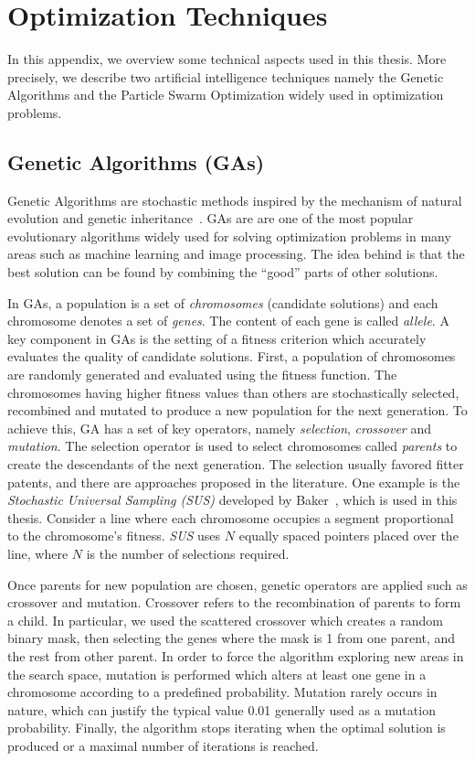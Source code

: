\chapter{Optimization Techniques} \label{app:optimization}
In this appendix, we overview some technical aspects used in this thesis. More precisely, we describe two artificial intelligence techniques namely the Genetic Algorithms and the Particle Swarm Optimization widely used in optimization problems.

\section{Genetic Algorithms (GAs)}
Genetic Algorithms are stochastic methods inspired by the mechanism of natural evolution and genetic inheritance~\cite{Yeh:LRIR07}. GAs are are one of the most popular evolutionary algorithms widely used for solving optimization problems in many areas such as machine learning and image processing.  The idea behind is that the best solution can be found by combining the ``good'' parts of other solutions.

In GAs, a population is a set of \emph{chromosomes} (candidate solutions) and each chromosome denotes a set of \emph{genes}. The content of each gene is called \emph{allele}. A key component in GAs is the setting of a fitness criterion which accurately evaluates the quality of candidate solutions. First, a population of chromosomes are randomly generated and evaluated using the fitness function. The chromosomes having higher fitness values than others are stochastically selected, recombined and mutated to produce a new population for the next generation. To achieve this, GA has a set of key operators, namely \emph{selection}, \emph{crossover} and \emph{mutation}. The selection operator is used to select chromosomes called \emph{parents} to create the descendants of the next generation. The selection usually favored fitter patents, and there are approaches proposed in the literature. One example is the \emph{Stochastic Universal Sampling (SUS)} developed by Baker~\cite{Baker:1987}, which is used in this thesis. Consider a line where each chromosome occupies a segment proportional to the chromosome's fitness. \emph{SUS} uses $N$ equally spaced pointers placed over the line, where $N$ is the number of selections required.

Once parents for new population are chosen, genetic operators are applied such as crossover and mutation. Crossover refers to the recombination of parents to form a child. In particular, we used the scattered crossover which creates a random binary mask, then selecting the genes where the mask is 1 from one parent, and the rest from other parent. In order to force the algorithm exploring new areas in the search space, mutation is performed which alters at least one gene in a chromosome according to a predefined probability. Mutation rarely occurs in nature, which can justify the typical value 0.01 generally used as a mutation probability. Finally, the algorithm stops iterating when the optimal solution is produced or a maximal number of iterations is reached.


